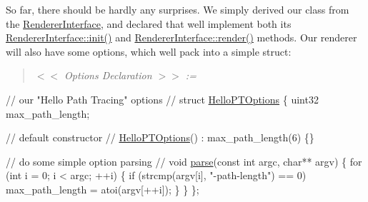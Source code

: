 \begin{DoxyParagraph}{}
So far, there should be hardly any surprises. We simply derived our class from the \hyperlink{struct_renderer_interface}{Renderer\+Interface}, and declared that we\textquotesingle{}ll implement both its \hyperlink{struct_renderer_interface_a2ead9b943d6d48fcd32872e0005ebe63}{Renderer\+Interface\+::init()} and \hyperlink{struct_renderer_interface_aa64254dd44c94929b05092dc8d74f29d}{Renderer\+Interface\+::render()} methods. Our renderer will also have some options, which we\textquotesingle{}ll pack into a simple struct\+: ~\newline
\label{_hello_renderer_page_Options_Declaration_anchor}%
%
 \begin{quote}
{\itshape  $<$$<$ Options Declaration $>$$>$ \+:= }

\end{quote}

\begin{DoxyCode}
\textcolor{comment}{// our "Hello Path Tracing" options}
\textcolor{comment}{//}
\textcolor{keyword}{struct }\hyperlink{struct_hello_p_t_options}{HelloPTOptions}
\{
     uint32 max\_path\_length;

    \textcolor{comment}{// default constructor}
    \textcolor{comment}{//}
    \hyperlink{struct_hello_p_t_options_a244c96683d3c5d345bdf4b6b8aa9c249}{HelloPTOptions}() : max\_path\_length(6) \{\}

    \textcolor{comment}{// do some simple option parsing}
    \textcolor{comment}{//}
    \textcolor{keywordtype}{void} \hyperlink{struct_hello_p_t_options_a540d006dee6aff8ee5e8b3cfc8b0fa0b}{parse}(\textcolor{keyword}{const} \textcolor{keywordtype}{int} argc, \textcolor{keywordtype}{char}** argv)
    \{
        \textcolor{keywordflow}{for} (\textcolor{keywordtype}{int} i = 0; i < argc; ++i)
        \{
         \textcolor{keywordflow}{if} (strcmp(argv[i], \textcolor{stringliteral}{"-path-length"}) == 0)
             max\_path\_length = atoi(argv[++i]);
        \}
    \}
\};
\end{DoxyCode}

\end{DoxyParagraph}
